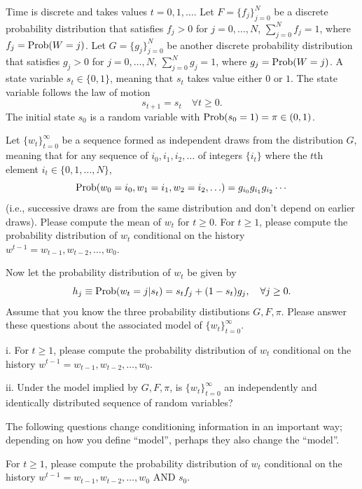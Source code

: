 \medskip

\noindent Time is discrete and takes values $t =0, 1, \ldots$.  Let $F = \{f_j\}_{j=0}^N$ be  a discrete probability distribution that satisfies $f_j > 0$ for $j=0, \ldots, N$, $\sum_{j=0}^N f_j = 1$,
where $f_j = {\rm Prob}(W = j)$.  Let $G = \{g_j\}_{j=0}^N$ be  another  discrete probability distribution that satisfies $g_j > 0$ for $j=0, \ldots, N$, $\sum_{j=0}^N g_j = 1$,
where $g_j = {\rm Prob}(W = j)$.  A state variable $s_t \in \{0,1\}$, meaning that $s_t$ takes value either $0$ or $1$.  The state variable follows the law of motion
$$ s_{t+1} = s_t \quad \forall t \geq 0 .$$
The initial state $s_0$ is a random variable with ${\rm Prob} (s_0 = 1) = \pi \in (0,1)$.

\medskip
{}  Let  $\{w_t\}_{t=0}^\infty$ be a sequence formed as independent draws from the distribution $G$, meaning that
for any sequence of $i_0, i_1, i_2, \ldots $ of integers $\{i_t\}$ where the $t$th element $i_t  \in \{0, 1, \ldots, N\}$,
 $${\rm Prob}(w_0 = i_0, w_1 = i_1, w_2 = i_2, \ldots)  = g_{i_0} g_{i_1} g_{i_2}  \cdots $$
(i.e., successive draws are from the same distribution and don't depend on earlier draws). Please compute the mean of $w_t$ for $t \geq 0$.
For $t \geq 1$,
please compute the probability distribution of  $w_t$ conditional on the history $w^{t-1} = w_{t-1}, w_{t-2}, \ldots, w_0$.

\medskip
{} Now let  the probability distribution of $w_t$  be given by
$$ h_j \equiv {\rm Prob}(w_t = j | s_t)  = s_t f_j + (1-s_t) g_j ,  \quad \forall j \geq 0. $$
Assume that you know the three probability distibutions $G, F, \pi$.
Please answer these questions about the associated   model of  $\{w_t\}_{t=0}^\infty$.


\smallskip
\item{i.}  For $t \geq 1$,
please compute the probability distribution of  $w_t$ conditional on the history $w^{t-1} = w_{t-1}, w_{t-2}, \ldots, w_0$.


\item{ii.} Under the model implied by $G, F, \pi$, is $\{w_t\}_{t=0}^\infty$ an independently and identically distributed sequence of random variables?

\medskip


\noindent The following questions change conditioning information in an important way; depending on how you define ``model'', perhaps they also change the ``model''.


\medskip
{} For $t \geq 1$,
please compute the probability distribution of  $w_t$ conditional on  the history $w^{t-1} = w_{t-1}, w_{t-2}, \ldots, w_0$ AND $s_0$.

